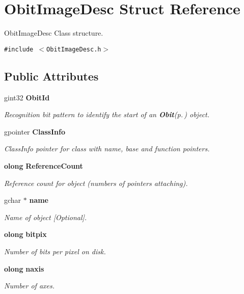\section{Obit\-Image\-Desc Struct Reference}
\label{structObitImageDesc}
Obit\-Image\-Desc Class structure.  


{\tt \#include $<$Obit\-Image\-Desc.h$>$}

\subsection*{Public Attributes}
\begin{CompactItemize}
\item 
gint32 {\bf Obit\-Id}
\begin{CompactList}\small\item\em Recognition bit pattern to identify the start of an {\bf Obit}{\rm (p.\,\pageref{structObit})} object. \item\end{CompactList}\item 
gpointer {\bf Class\-Info}
\begin{CompactList}\small\item\em Class\-Info pointer for class with name, base and function pointers. \item\end{CompactList}\item 
{\bf olong} {\bf Reference\-Count}
\begin{CompactList}\small\item\em Reference count for object (numbers of pointers attaching). \item\end{CompactList}\item 
gchar $\ast$ {\bf name}
\begin{CompactList}\small\item\em Name of object [Optional]. \item\end{CompactList}\item 
{\bf olong} {\bf bitpix}
\begin{CompactList}\small\item\em Number of bits per pixel on disk. \item\end{CompactList}\item 
{\bf olong} {\bf naxis}
\begin{CompactList}\small\item\em Number of axes. \item\end{CompactList}\item 

\end{CompactItemize}
